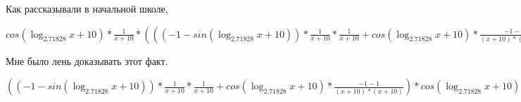 \documentclass[12pt,a4paper,fleqn]{article}
\theoremstyle{definition}
\begin{document}
Как рассказывали в начальной школе, 

$cos(\log_{ 2.71828 }{ x  +  10 }) * \frac{ 1 }{ x  +  10 }
 * ((( -1  - sin(\log_{ 2.71828 }{ x  +  10 })) * \frac{ 1 }{ x  +  10 }
 * \frac{ 1 }{ x  +  10 }
 + cos(\log_{ 2.71828 }{ x  +  10 }) * \frac{ -1  -  1 }{( x  +  10 ) * ( x  +  10 )}
) * { 3 }^{sin(\log_{ 2.71828 }{ x  +  10 })} + cos(\log_{ 2.71828 }{ x  +  10 }) * \frac{ 1 }{ x  +  10 }
 * cos(\log_{ 2.71828 }{ x  +  10 }) * \frac{ 1 }{ x  +  10 }
 * { 3 }^{sin(\log_{ 2.71828 }{ x  +  10 })}) = cos(\log_{ 2.71828 }{ x  +  10 }) * \frac{ 1 }{ x  +  10 }
 * ((( -1  - sin(\log_{ 2.71828 }{ x  +  10 })) * \frac{ 1 }{ x  +  10 }
 * \frac{ 1 }{ x  +  10 }
 + cos(\log_{ 2.71828 }{ x  +  10 }) * \frac{ -1  -  1 }{( x  +  10 ) * ( x  +  10 )}
) * { 3 }^{sin(\log_{ 2.71828 }{ x  +  10 })} + cos(\log_{ 2.71828 }{ x  +  10 }) * \frac{ 1 }{ x  +  10 }
 * cos(\log_{ 2.71828 }{ x  +  10 }) * \frac{ 1 }{ x  +  10 }
 * { 3 }^{sin(\log_{ 2.71828 }{ x  +  10 })})$

Мне было лень доказывать этот факт.

$(( -1  - sin(\log_{ 2.71828 }{ x  +  10 })) * \frac{ 1 }{ x  +  10 }
 * \frac{ 1 }{ x  +  10 }
 + cos(\log_{ 2.71828 }{ x  +  10 }) * \frac{ -1  -  1 }{( x  +  10 ) * ( x  +  10 )}
) * cos(\log_{ 2.71828 }{ x  +  10 }) * \frac{ 1 }{ x  +  10 }
 * { 3 }^{sin(\log_{ 2.71828 }{ x  +  10 })} + cos(\log_{ 2.71828 }{ x  +  10 }) * \frac{ 1 }{ x  +  10 }
 * ((( -1  - sin(\log_{ 2.71828 }{ x  +  10 })) * \frac{ 1 }{ x  +  10 }
 * \frac{ 1 }{ x  +  10 }
 + cos(\log_{ 2.71828 }{ x  +  10 }) * \frac{ -1  -  1 }{( x  +  10 ) * ( x  +  10 )}
) * { 3 }^{sin(\log_{ 2.71828 }{ x  +  10 })} + cos(\log_{ 2.71828 }{ x  +  10 }) * \frac{ 1 }{ x  +  10 }
 * cos(\log_{ 2.71828 }{ x  +  10 }) * \frac{ 1 }{ x  +  10 }
 * { 3 }^{sin(\log_{ 2.71828 }{ x  +  10 })}) = (( -1  - sin(\log_{ 2.71828 }{ x  +  10 })) * \frac{ 1 }{ x  +  10 }
 * \frac{ 1 }{ x  +  10 }
 + cos(\log_{ 2.71828 }{ x  +  10 }) * \frac{ -1  -  1 }{( x  +  10 ) * ( x  +  10 )}
) * cos(\log_{ 2.71828 }{ x  +  10 }) * \frac{ 1 }{ x  +  10 }
 * { 3 }^{sin(\log_{ 2.71828 }{ x  +  10 })} + cos(\log_{ 2.71828 }{ x  +  10 }) * \frac{ 1 }{ x  +  10 }
 * ((( -1  - sin(\log_{ 2.71828 }{ x  +  10 })) * \frac{ 1 }{ x  +  10 }
 * \frac{ 1 }{ x  +  10 }
 + cos(\log_{ 2.71828 }{ x  +  10 }) * \frac{ -1  -  1 }{( x  +  10 ) * ( x  +  10 )}
) * { 3 }^{sin(\log_{ 2.71828 }{ x  +  10 })} + cos(\log_{ 2.71828 }{ x  +  10 }) * \frac{ 1 }{ x  +  10 }
 * cos(\log_{ 2.71828 }{ x  +  10 }) * \frac{ 1 }{ x  +  10 }
 * { 3 }^{sin(\log_{ 2.71828 }{ x  +  10 })})$
\end{document}
